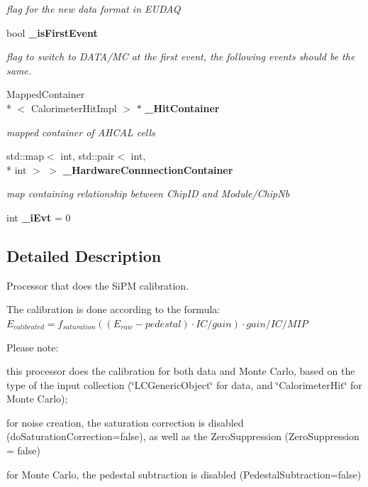 \begin{DoxyCompactItemize}
\begin{DoxyCompactList}\small\item\em flag for the new data format in E\-U\-D\-A\-Q \end{DoxyCompactList}\item 
bool {\bf \-\_\-is\-First\-Event}
\begin{DoxyCompactList}\small\item\em flag to switch to D\-A\-T\-A/\-M\-C at the first event, the following events should be the same. \end{DoxyCompactList}\item 
Mapped\-Container\\*
$<$ Calorimeter\-Hit\-Impl $>$ $\ast$ {\bf \-\_\-\-Hit\-Container}\label{classCALICE_1_1Ahc2TimeCalibrator_a7627ab3a3eb5245b1500a5a228bd3ccb}

\begin{DoxyCompactList}\small\item\em mapped container of A\-H\-C\-A\-L cells \end{DoxyCompactList}\item 
std\-::map$<$ int, std\-::pair$<$ int, \\*
int $>$ $>$ {\bf \-\_\-\-Hardware\-Connnection\-Container}\label{classCALICE_1_1Ahc2TimeCalibrator_aa91b9bbcb6a6a3be99515647e895e611}

\begin{DoxyCompactList}\small\item\em map containing relationship between Chip\-I\-D and Module/\-Chip\-Nb \end{DoxyCompactList}\item 
int {\bfseries \-\_\-i\-Evt} = 0\label{classCALICE_1_1Ahc2TimeCalibrator_a2441a8d16fa6b8f36d6ffbbe2bccfe85}

\end{DoxyCompactItemize}


\subsection{Detailed Description}
Processor that does the Si\-P\-M calibration. 

The calibration is done according to the formula\-: $E_{calibrated}=f_{saturation}((E_{raw}-pedestal) \cdot IC/gain) \cdot gain/IC/MIP$

Please note\-:
\begin{DoxyItemize}
\item this processor does the calibration for both data and Monte Carlo, based on the type of the input collection (\char`\"{}\-L\-C\-Generic\-Object\char`\"{} for data, and \char`\"{}\-Calorimeter\-Hit\char`\"{} for Monte Carlo);
\item for noise creation, the saturation correction is disabled (do\-Saturation\-Correction=false), as well as the Zero\-Suppression (Zero\-Suppression = false)
\item for Monte Carlo, the pedestal subtraction is disabled (Pedestal\-Subtraction=false)
\end{DoxyItemize}

